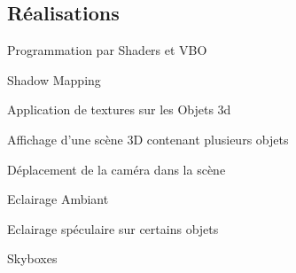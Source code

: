 \subsection*{Réalisations}


\begin{DoxyItemize}
\item Programmation par Shaders et V\+BO
\item Shadow Mapping
\item Application de textures sur les Objets 3d
\item Affichage d’une scène 3D contenant plusieurs objets
\item Déplacement de la caméra dans la scène
\item Eclairage Ambiant
\item Eclairage spéculaire sur certains objets
\item Skyboxes 
\end{DoxyItemize}